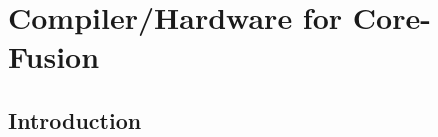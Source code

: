 \chapter{Compiler/Hardware for Core-Fusion}

\section{Introduction}\label{sect:introduction-chapter3}
%
%
%